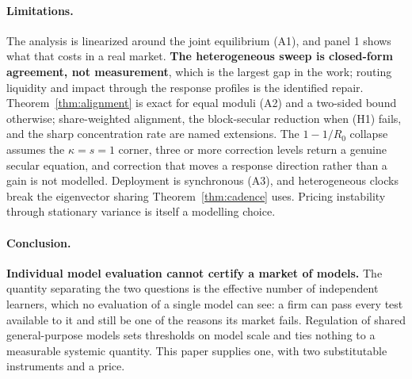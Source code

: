 \documentclass{article}
\theoremstyle{plain}
\theoremstyle{definition}
\begin{document}
\paragraph{Limitations.}
The analysis is linearized around the joint equilibrium (A1), and panel 1 shows what that costs in a real market. \textbf{The heterogeneous sweep is closed-form agreement, not measurement}, which is the largest gap in the work; routing liquidity and impact through the response profiles is the identified repair. Theorem~\ref{thm:alignment} is exact for equal moduli (A2) and a two-sided bound otherwise; share-weighted alignment, the block-secular reduction when (H1) fails, and the sharp concentration rate are named extensions. The $1-1/R_0$ collapse assumes the $\kappa=s=1$ corner, three or more correction levels return a genuine secular equation, and correction that moves a response direction rather than a gain is not modelled. Deployment is synchronous (A3), and heterogeneous clocks break the eigenvector sharing Theorem~\ref{thm:cadence} uses. Pricing instability through stationary variance is itself a modelling choice.

\paragraph{Conclusion.}
\textbf{Individual model evaluation cannot certify a market of models.} The quantity separating the two questions is the effective number of independent learners, which no evaluation of a single model can see: a firm can pass every test available to it and still be one of the reasons its market fails. Regulation of shared general-purpose models sets thresholds on model scale and ties nothing to a measurable systemic quantity. This paper supplies one, with two substitutable instruments and a price.
\end{document}
